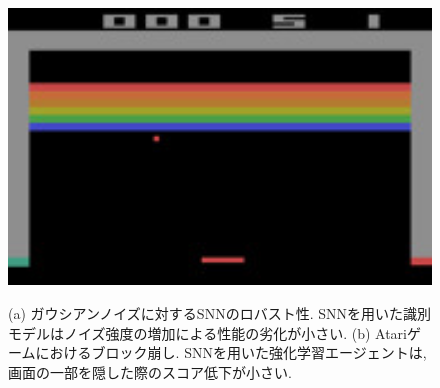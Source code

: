 \begin{figure}[htb]
    \centering

    \begin{minipage}{0.45\textwidth}
        \centering
        
        \label{fig:robust:gaussian}
    \end{minipage}
    \hspace{0.02\textwidth}
    \begin{minipage}{0.45\textwidth}
        \centering
        \includegraphics[width=1.0\textwidth]{Static/chap1_robust_atari.jpg}
        \label{fig:robust:atari}
    \end{minipage}

    \caption[SNNのロバスト性]{
        (a) ガウシアンノイズに対するSNNのロバスト性. 
        SNNを用いた識別モデルはノイズ強度の増加による性能の劣化が小さい.
        (b) Atariゲームにおけるブロック崩し.
        SNNを用いた強化学習エージェントは, 画面の一部を隠した際のスコア低下が小さい.
    }
\end{figure}

